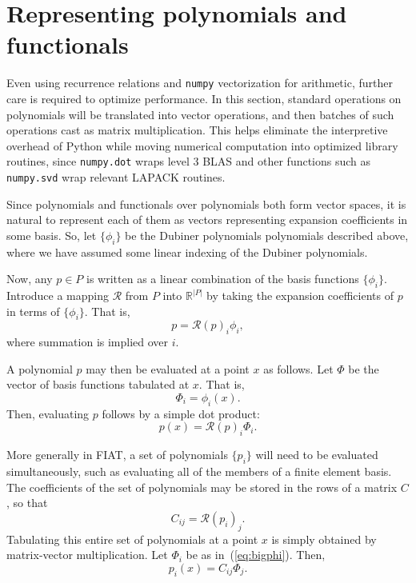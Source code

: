 \section{Representing polynomials and functionals}
Even using recurrence relations and \texttt{numpy} vectorization for
arithmetic, further care is required to optimize performance.  In this
section, standard
operations on polynomials will be translated into vector operations, and
then batches of such operations cast as matrix multiplication.  This
helps eliminate the interpretive overhead of Python while moving
numerical computation into  optimized library routines, since
\texttt{numpy.dot} wraps level 3 BLAS and other functions such as
\texttt{numpy.svd} wrap relevant LAPACK routines.

Since polynomials and
functionals over polynomials both form vector spaces, it is natural
to represent each of them as vectors representing expansion
coefficients in some basis.  So, let \( \{ \phi_i \} \) be the Dubiner polynomials
polynomials described above, where we have assumed some linear
indexing of the Dubiner polynomials.

Now, any \( p \in P \) is written as a linear combination of the basis
functions \( \{ \phi_i \} \).  Introduce a mapping \( \mathcal{R} \)
from \( P \) into \( \mathbb{R}^{|P|} \) by taking the expansion
coefficients of \( p \) in terms of \( \{ \phi_i \} \).  That is,
\[
p = \mathcal{R}(p)_i \phi_i,
\]
where summation is implied over \( i \).

A polynomial \( p \) may then be evaluated at a point \( x \) as
follows.  Let \( \Phi \) be the vector of basis functions tabulated at \( x
\).  That is,
\begin{equation}
\label{eq:bigphi}
\Phi_i = \phi_i(x).
\end{equation}
Then, evaluating \( p \) follows by a simple dot product:
\begin{equation}
\label{eq:doteval}
p(x) = \mathcal{R}(p)_i \Phi_i.
\end{equation}

More generally in FIAT, a set of polynomials \( \{ p_i \} \) will need
to be evaluated simultaneously, such as evaluating all of the members
of a finite element basis.
The coefficients of the set of
polynomials may be stored in the rows of a matrix \( C \), so
that
\[
C_{ij} = \mathcal{R}(p_i)_j.
\]
Tabulating this entire set of polynomials at a point \( x \) is simply
obtained by matrix-vector multiplication.  Let \( \Phi_i \) be as
in~(\ref{eq:bigphi}).  Then,
\[
p_i(x) = C_{ij} \Phi_j.
\]

